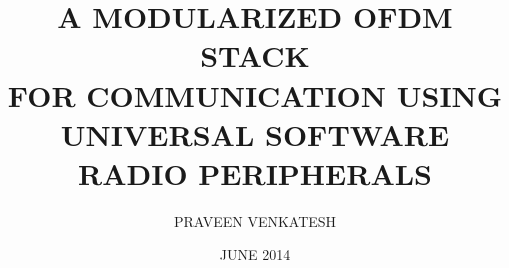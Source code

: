 \title{A MODULARIZED OFDM STACK \\
       FOR COMMUNICATION USING \\
       UNIVERSAL SOFTWARE \\
       RADIO PERIPHERALS}

\author{PRAVEEN VENKATESH}

\date{JUNE 2014}

\maketitle
